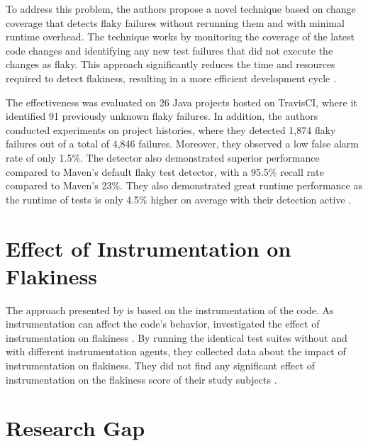 To address this problem, the authors propose a novel technique based on change coverage that detects flaky failures without rerunning them and with minimal runtime overhead.
The technique works by monitoring the coverage of the latest code changes and identifying any new test failures that did not execute the changes as flaky.
This approach significantly reduces the time and resources required to detect flakiness, resulting in a more efficient development cycle \autocite{bell_deflaker_2018}.

The effectiveness was evaluated on 26 Java projects hosted on TravisCI, where it identified 91 previously unknown flaky failures.
In addition, the authors conducted experiments on project histories, where they detected 1,874 flaky failures out of a total of 4,846 failures.
Moreover, they observed a low false alarm rate of only 1.5\%.
The detector also demonstrated superior performance compared to Maven's default flaky test detector, with a 95.5\% recall rate compared to Maven's 23\%.
They also demonstrated great runtime performance as the runtime of tests is only 4.5\% higher on average with their detection active \autocite{bell_deflaker_2018}.

\section{Effect of Instrumentation on Flakiness}
The approach presented by \citeauthor*{bell_deflaker_2018} is based on the instrumentation of the code.
As instrumentation can affect the code's behavior, \citeauthor*{rasheed_effect_2023} investigated the effect of instrumentation on flakiness \autocite{rasheed_effect_2023}.
By running the identical test suites without and with different instrumentation agents, they collected data about the impact of instrumentation on flakiness.
They did not find any significant effect of instrumentation on the flakiness score of their study subjects \autocite{rasheed_effect_2023}.


\section{Research Gap}


